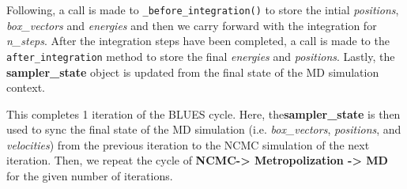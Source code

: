 Following, a call is made to \texttt{_before_integration()} to store the intial \emph{positions}, \emph{box\_vectors} and \emph{energies} and then we carry forward with the integration for \emph{n\_steps}.
After the integration steps have been completed, a call is made to the \texttt{after_integration} method to store the final \emph{energies} and \emph{positions}.
Lastly, the \textbf{sampler\_state} object is updated from the final state of the MD simulation context.

This completes 1 iteration of the BLUES cycle. 
Here, the\textbf{sampler\_state} is then used to sync the final state of the MD simulation (i.e. \emph{box\_vectors}, \emph{positions}, and \emph{velocities}) from the previous iteration to the NCMC simulation of the next iteration. 
Then, we repeat the cycle of \textbf{NCMC-\textgreater{} Metropolization -\textgreater{} MD} for the given number of iterations.